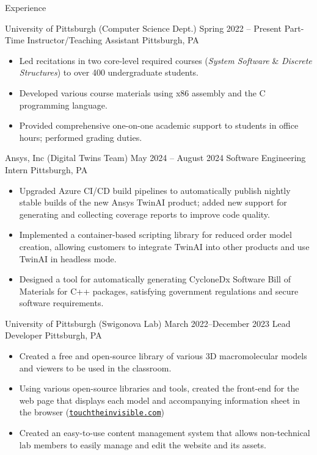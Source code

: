 \begin{rSection}{Experience}
	\begin{jobListing}
    {University of Pittsburgh (Computer Science Dept.)}
    {Spring 2022 – Present}
    {Part-Time Instructor/Teaching Assistant}
    {Pittsburgh, PA}
		\begin{itemize}
			\item Led recitations in two core-level required courses (\textit{System Software} \& \textit{Discrete Structures}) to over 400 undergraduate students.
			\item Developed various course materials using x86 assembly and the C programming language.
			\item Provided comprehensive one-on-one academic support to students in office hours; performed grading duties.
		\end{itemize}
	\end{jobListing}
	
	\begin{jobListing}
    {Ansys, Inc (Digital Twins Team)}
    {May 2024 – August 2024}
    {Software Engineering Intern}
    {Pittsburgh, PA}
		\begin{itemize}
			\item Upgraded Azure CI/CD build pipelines to automatically publish nightly stable builds of the new Ansys TwinAI product; added new support for generating and collecting coverage reports to improve code quality.
			\item Implemented a container-based scripting library for reduced order model creation, allowing customers to integrate TwinAI into other products and use TwinAI in headless mode.
			\item Designed a tool for automatically generating CycloneDx Software Bill of Materials for C++ packages, satisfying government regulations and secure software requirements.
		\end{itemize}
	\end{jobListing}
	
	\begin{jobListing}
    {University of Pittsburgh (Swigonova Lab)}
    {March 2022–December 2023}
    {Lead Developer}
    {Pittsburgh, PA}
		\begin{itemize}
			\item Created a free and open-source library of various 3D macromolecular models and viewers to be used in the classroom.
			\item Using various open-source libraries and tools, created the front-end for the web page that displays each model and accompanying information sheet in the browser (\href{https://touchtheinvisible.com}{\nolinkurl{touchtheinvisible.com}})
			\item Created an easy-to-use content management system that allows non-technical lab members to easily manage and edit the website and its assets.
		\end{itemize}
	\end{jobListing}	
\end{rSection}